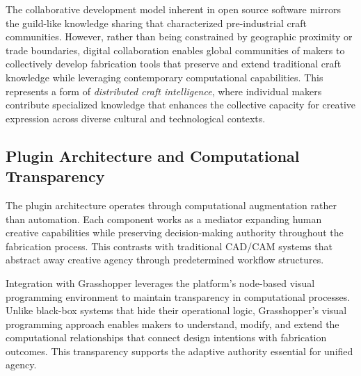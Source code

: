 \vspace{0.5cm}

The collaborative development model inherent in open source software mirrors the guild-like knowledge sharing that characterized pre-industrial craft communities. However, rather than being constrained by geographic proximity or trade boundaries, digital collaboration enables global communities of makers to collectively develop fabrication tools that preserve and extend traditional craft knowledge while leveraging contemporary computational capabilities. This represents a form of \textit{distributed craft intelligence}, where individual makers contribute specialized knowledge that enhances the collective capacity for creative expression across diverse cultural and technological contexts.

\subsection{Plugin Architecture and Computational Transparency}

The plugin architecture operates through computational augmentation rather than automation. Each component works as a mediator expanding human creative capabilities while preserving decision-making authority throughout the fabrication process. This contrasts with traditional CAD/CAM systems that abstract away creative agency through predetermined workflow structures.

\vspace{0.5cm}

Integration with Grasshopper leverages the platform's node-based visual programming environment to maintain transparency in computational processes. Unlike black-box systems that hide their operational logic, Grasshopper's visual programming approach enables makers to understand, modify, and extend the computational relationships that connect design intentions with fabrication outcomes. This transparency supports the adaptive authority essential for unified agency.